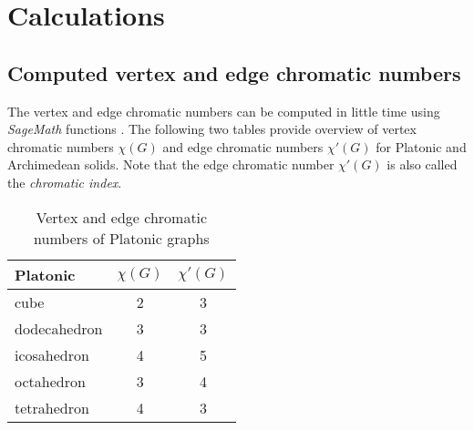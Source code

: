 \chapter{Calculations}

\section{Computed vertex and edge chromatic numbers}

The vertex and edge chromatic numbers can be computed in little time using \textit{SageMath} functions \cite{sagemath-chromatic-number} \cite{sagemath-chromatic-index}. The following two tables provide overview of vertex chromatic numbers $\chi(G)$  and edge chromatic numbers $\chi'(G)$ for Platonic and Archimedean solids. Note that the edge chromatic number $\chi'(G)$ is also called the \textit{chromatic index}.


\begin{table}[H]
    \centering
    \caption{Vertex and edge chromatic numbers of Platonic graphs}
    \vspace{5pt}
    \label{tab:platonic-chrom-nums}
    \begin{tabular}{|l|c|c|}
    \hline
    Platonic & $\chi(G)$ & $\chi'(G)$ \\
    \hline\hline
    cube & 2 & 3 \\
    \hline
    dodecahedron & 3 & 3 \\
    \hline
    icosahedron & 4 & 5 \\
    \hline
    octahedron & 3 & 4 \\
    \hline
    tetrahedron & 4 & 3 \\
    \hline
    \end{tabular}
\end{table}

